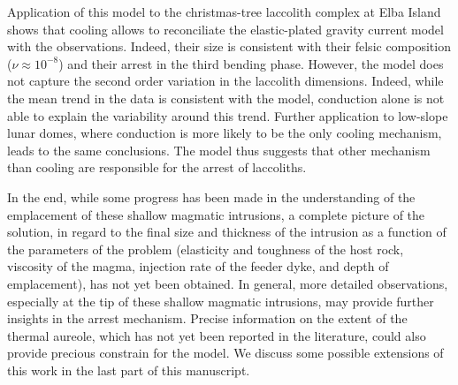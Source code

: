Application of this  model to the christmas-tree  laccolith complex at
Elba   Island  shows   that   cooling  allows   to  reconciliate   the
elastic-plated gravity  current model  with the  observations. Indeed,
their   size    is   consistent   with   their    felsic   composition
($\nu  \approx  10^{-8}$)  and  their  arrest  in  the  third  bending
phase. However, the model does  not capture the second order variation
in the laccolith dimensions. Indeed, while  the mean trend in the data
is consistent with the model, conduction  alone is not able to explain
the variability  around this trend.  Further  application to low-slope
lunar domes,  where conduction is more  likely to be the  only cooling
mechanism, leads  to the  same conclusions.   The model  thus suggests
that other  mechanism than cooling  are responsible for the  arrest of
laccoliths.

In the end, while some progress  has been made in the understanding of
the  emplacement  of these  shallow  magmatic  intrusions, a  complete
picture of the solution, in regard  to the final size and thickness of
the  intrusion  as  a  function  of  the  parameters  of  the  problem
(elasticity and  toughness of the  host rock, viscosity of  the magma,
injection rate of the feeder dyke,  and depth of emplacement), has not
yet been obtained.  In general, more detailed observations, especially
at the tip  of these shallow magmatic intrusions,  may provide further
insights in the  arrest mechanism.  Precise information  on the extent
of  the thermal  aureole,  which  has not  yet  been  reported in  the
literature, could  also provide precious  constrain for the  model. We
discuss some possible extensions of this work in the last part of this
manuscript.


